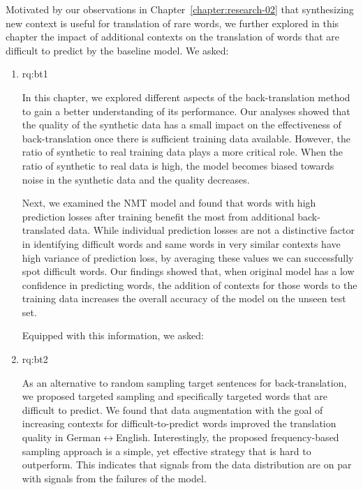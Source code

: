 Motivated by our observations in Chapter~\ref{chapter:research-02} that synthesizing new context is useful for translation of rare words, we further explored in this chapter the impact of additional contexts on the translation of words that are difficult to predict by the baseline model. 
We asked:
 
\begin{enumerate}[label=\textbf{RQ2.\arabic* },wide = 0pt, leftmargin=2em]
\setlength\itemsep{1em}
 \setcounter{enumi}{2}
\item \acl{rq:bt1}

\medskip

\noindent In this chapter, we explored different aspects of the back-translation method to gain a better understanding of its performance.
Our analyses showed that the quality of the synthetic data has a small impact on the effectiveness of back-translation once there is sufficient training data available.
However, the ratio of synthetic to real training data plays a more critical role.
When the ratio of synthetic to real data is high, the model becomes biased towards noise in the synthetic data and the quality decreases.

Next, we examined the NMT model and found that words with high prediction losses after training benefit the most from additional back-translated data.
While individual prediction losses are not a distinctive factor in identifying difficult words and same words in very similar contexts have high variance of prediction loss, by averaging these values we can successfully spot difficult words.
Our findings showed that, when original model has a low confidence in predicting words, the addition of contexts for those words to the training data increases the overall accuracy of the model on the unseen test set. %

\noindent 
Equipped with this information, we asked:

\item \acl{rq:bt2}

\medskip

\noindent As an alternative to random sampling target sentences for back-translation, we proposed targeted sampling and specifically targeted words that are difficult to predict.
We found that data augmentation with the goal of increasing contexts for difficult-to-predict words improved the translation quality in German$\leftrightarrow$English. %
Interestingly, the proposed frequency-based sampling approach is a simple, yet effective strategy that is hard to outperform.
This indicates that signals from the data distribution are on par with signals from the failures of the model.

\end{enumerate}


